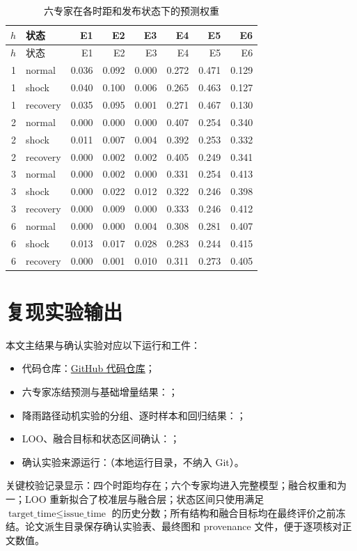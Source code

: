 \documentclass[UTF8,11pt,a4paper]{ctexart}
\begin{document}
\begin{longtable}{rlrrrrrr}
\caption{六专家在各时距和发布状态下的预测权重}\label{tab:weights-full}\\
\toprule
$h$ & 状态 & E1 & E2 & E3 & E4 & E5 & E6\\
\midrule
\endfirsthead
\toprule
$h$ & 状态 & E1 & E2 & E3 & E4 & E5 & E6\\
\midrule
\endhead
1 & normal & 0.036 & 0.092 & 0.000 & 0.272 & 0.471 & 0.129\\
1 & shock & 0.040 & 0.100 & 0.006 & 0.265 & 0.463 & 0.127\\
1 & recovery & 0.035 & 0.095 & 0.001 & 0.271 & 0.467 & 0.130\\
2 & normal & 0.000 & 0.000 & 0.000 & 0.407 & 0.254 & 0.340\\
2 & shock & 0.011 & 0.007 & 0.004 & 0.392 & 0.253 & 0.332\\
2 & recovery & 0.000 & 0.002 & 0.002 & 0.405 & 0.249 & 0.341\\
3 & normal & 0.000 & 0.002 & 0.000 & 0.331 & 0.254 & 0.413\\
3 & shock & 0.000 & 0.022 & 0.012 & 0.322 & 0.246 & 0.398\\
3 & recovery & 0.000 & 0.009 & 0.000 & 0.333 & 0.246 & 0.412\\
6 & normal & 0.000 & 0.000 & 0.004 & 0.308 & 0.281 & 0.407\\
6 & shock & 0.013 & 0.017 & 0.028 & 0.283 & 0.244 & 0.415\\
6 & recovery & 0.000 & 0.001 & 0.010 & 0.311 & 0.273 & 0.405\\
\bottomrule
\end{longtable}

\section{复现实验输出}

本文主结果与确认实验对应以下运行和工件：
\begin{itemize}
  \item 代码仓库：\href{https://github.com/HY-1024/Adaptive-Multi-Expert-Bike-Sharing-Demand-Forecasting-under-Weather-Shocks-and-Recovery-Dynamics.git}{GitHub 代码仓库}；
  \item 六专家冻结预测与基础增量结果：；
  \item 降雨路径动机实验的分组、逐时样本和回归结果：；
  \item LOO、融合目标和状态区间确认：；
  \item 确认实验来源运行：（本地运行目录，不纳入 Git）。
\end{itemize}
关键校验记录显示：四个时距均存在；六个专家均进入完整模型；融合权重和为一；LOO 重新拟合了校准层与融合层；状态区间只使用满足 $\text{target\_time}\leq\text{issue\_time}$ 的历史分数；所有结构和融合目标均在最终评价之前冻结。论文派生目录保存确认实验表、最终图和 provenance 文件，便于逐项核对正文数值。
\end{document}
